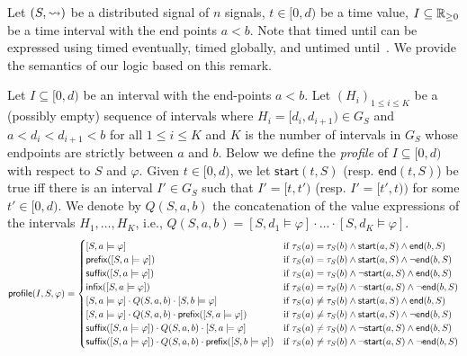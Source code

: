 Let $(S, {\rightsquigarrow})$ be a distributed signal of $n$ signals, $t \in [0,d)$ be a time value, $I \subseteq \mathbb{R}_{\geq 0}$ be a time interval with the end points $a < b$.
Note that timed until can be expressed using timed eventually, timed globally, and untimed until~\cite{DBLP:journals/sttt/MalerN13}.
We provide the semantics of our logic based on this remark. %

Let $I \subseteq [0,d)$ be an interval with the end-points $a < b$.
Let $(H_i)_{1 \leq i \leq K}$ be a (possibly empty) sequence of intervals where $H_i = [d_i, d_{i+1}) \in G_S$ and $a < d_i < d_{i+1} < b$ for all $1 \leq i \leq K$ and $K$ is the number of intervals in $G_S$ whose endpoints are strictly between $a$ and $b$.
Below we define the \emph{profile} of $I \subseteq [0,d)$ with respect to $S$ and $\varphi$.
Given $t \in [0,d)$, we let $\mathsf{start}(t, S)$ (resp. $\mathsf{end}(t, S)$) be true iff there is an interval $I' \in G_S$ such that $I' = [t, t')$ (resp. $I' = [t', t))$ for some $t' \in [0,d)$.
We denote by $Q(S, a, b)$ the concatenation of the value expressions of the intervals $H_1, \ldots, H_K$, i.e., $Q(S, a, b) = [S, d_1 \models \varphi] \cdot \ldots \cdot [S, d_K \models \varphi]$.
\begin{equation*} 
	\mathsf{profile}(I, S, \varphi) =
	\begin{cases}
		[S, a \models \varphi] &\text{if $\tau_S(a) = \tau_S(b) \land \mathsf{start}(a, S) \land \mathsf{end}(b, S)$} \\
		\textsf{prefix}([S, a \models \varphi]) &\text{if $\tau_S(a) = \tau_S(b) \land \mathsf{start}(a, S) \land \lnot\mathsf{end}(b, S)$} \\
		\textsf{suffix}([S, a \models \varphi]) &\text{if $\tau_S(a) = \tau_S(b) \land \lnot\mathsf{start}(a, S) \land \mathsf{end}(b, S)$} \\
		\textsf{infix}([S, a \models \varphi]) &\text{if $\tau_S(a) = \tau_S(b) \land \lnot\mathsf{start}(a, S) \land \lnot\mathsf{end}(b, S)$} \\
		[S, a \models \varphi] \cdot Q(S, a, b) \cdot [S, b \models \varphi] &\text{if $\tau_S(a) \neq \tau_S(b) \land \mathsf{start}(a, S) \land \mathsf{end}(b, S)$} \\
		[S, a \models \varphi] \cdot Q(S, a, b) \cdot \textsf{prefix}([S, a \models \varphi]) &\text{if $\tau_S(a) \neq \tau_S(b) \land \mathsf{start}(a, S) \land \lnot\mathsf{end}(b, S)$} \\
		\textsf{suffix}([S, a \models \varphi]) \cdot Q(S, a, b) \cdot [S, a \models \varphi] &\text{if $\tau_S(a) \neq \tau_S(b) \land \lnot\mathsf{start}(a, S) \land \mathsf{end}(b, S)$} \\
		\textsf{suffix}([S, a \models \varphi]) \cdot Q(S, a, b) \cdot \textsf{prefix}([S, b \models \varphi]) &\text{if $\tau_S(a) \neq \tau_S(b) \land \lnot\mathsf{start}(a, S) \land \lnot\mathsf{end}(b, S)$} 
	\end{cases}
\end{equation*}

